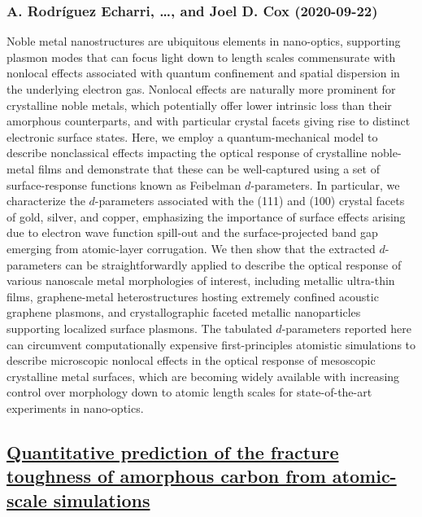 {\subsubsection*{A. Rodríguez Echarri, \dots, and Joel D. Cox (2020-09-22)}
Noble metal nanostructures are ubiquitous elements in nano-optics, supporting
plasmon modes that can focus light down to length scales commensurate with
nonlocal effects associated with quantum confinement and spatial dispersion in
the underlying electron gas. Nonlocal effects are naturally more prominent for
crystalline noble metals, which potentially offer lower intrinsic loss than
their amorphous counterparts, and with particular crystal facets giving rise to
distinct electronic surface states. Here, we employ a quantum-mechanical model
to describe nonclassical effects impacting the optical response of crystalline
noble-metal films and demonstrate that these can be well-captured using a set
of surface-response functions known as Feibelman $d$-parameters. In particular,
we characterize the $d$-parameters associated with the (111) and (100) crystal
facets of gold, silver, and copper, emphasizing the importance of surface
effects arising due to electron wave function spill-out and the
surface-projected band gap emerging from atomic-layer corrugation. We then show
that the extracted $d$-parameters can be straightforwardly applied to describe
the optical response of various nanoscale metal morphologies of interest,
including metallic ultra-thin films, graphene-metal heterostructures hosting
extremely confined acoustic graphene plasmons, and crystallographic faceted
metallic nanoparticles supporting localized surface plasmons. The tabulated
$d$-parameters reported here can circumvent computationally expensive
first-principles atomistic simulations to describe microscopic nonlocal effects
in the optical response of mesoscopic crystalline metal surfaces, which are
becoming widely available with increasing control over morphology down to
atomic length scales for state-of-the-art experiments in nano-optics.

\subsection*{\href{http://arxiv.org/abs/2009.10809v1}{Quantitative prediction of the fracture toughness of amorphous carbon  from atomic-scale simulations}}
}
